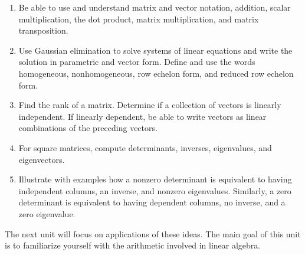 
\begin{enumerate}

\item Be able to use and understand matrix and vector notation, addition, scalar multiplication, the dot product, matrix multiplication, and matrix transposition. 
\item Use Gaussian elimination to solve systems of linear equations and write the solution in parametric and vector form. Define and use the words homogeneous, nonhomogeneous, row echelon form, and reduced row echelon form. 
\item Find the rank of a matrix. Determine if a collection of vectors is linearly independent. If linearly dependent, be able to write vectors as linear combinations of the preceding vectors.
\item For square matrices, compute determinants, inverses, eigenvalues, and eigenvectors. 
\item Illustrate with examples how a nonzero determinant is equivalent to having independent columns, an inverse, and nonzero eigenvalues. Similarly, a zero determinant is equivalent to having dependent columns, no inverse, and a zero eigenvalue. 

\end{enumerate}

The next unit will focus on applications of these ideas. The main goal of this unit is to familiarize yourself with the arithmetic involved in linear algebra.


